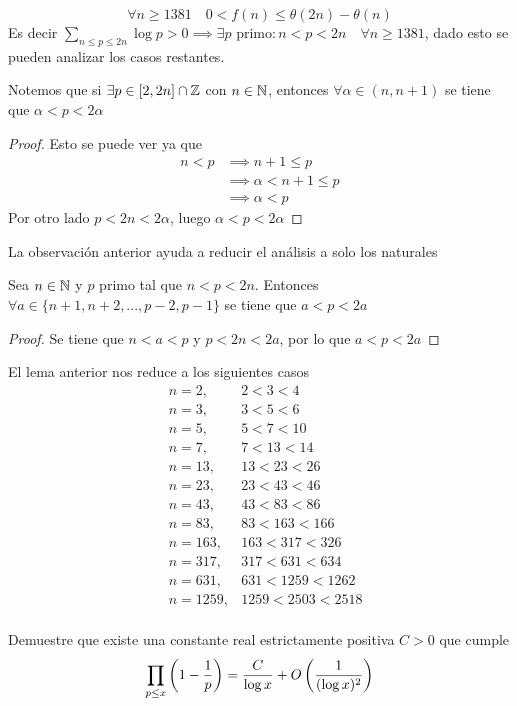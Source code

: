 \begin{sol}
	\[\forall n\geq1381\quad0<f(n)\leq\theta(2n)-\theta(n)\]
	Es decir $\displaystyle\sum_{n\leq p\leq 2n}\log{p}>0\implies\exists p\text{ primo}:n<p<2n\quad\forall n\geq1381$, dado esto se pueden analizar los casos restantes.
	\begin{obs}
		Notemos que si $\exists p\in[2,2n]\cap\mathbb{Z}$ con $n\in\mathbb{N}$, entonces $\forall\alpha\in(n,n+1)$ se tiene que $\alpha<p<2\alpha$
		\begin{proof}
			Esto se puede ver ya que
			\begin{align*}
				n<p & \implies n+1\leq p       \\
				    & \implies\alpha<n+1\leq p \\
				    & \implies\alpha<p
			\end{align*}
			Por otro lado $p<2n<2\alpha$, luego $\alpha<p<2\alpha$
		\end{proof}
	\end{obs}
	{\flushleft La observación anterior ayuda a reducir el análisis a solo los naturales}
	\begin{lem}
		Sea $n\in\mathbb{N}$ y $p$ primo tal que $n<p<2n$. Entonces $\forall a\in\{n+1,n+2,...,p-2,p-1\}$ se tiene que $a<p<2a$
		\begin{proof}
			Se tiene que $n<a<p$ y $p<2n<2a$, por lo que $a<p<2a$
		\end{proof}
	\end{lem}
	{\flushleft El lema anterior nos reduce a los siguientes casos}
	\begin{align*}
		 & n=2,    & 2<3<4          \\
		 & n=3,    & 3<5<6          \\
		 & n=5,    & 5<7<10         \\
		 & n=7,    & 7<13<14        \\
		 & n=13,   & 13<23<26       \\
		 & n=23,   & 23<43<46       \\
		 & n=43,   & 43<83<86       \\
		 & n=83,   & 83<163<166     \\
		 & n=163,  & 163<317<326    \\
		 & n=317,  & 317<631<634    \\
		 & n=631,  & 631<1259<1262  \\
		 & n=1259, & 1259<2503<2518 \\
	\end{align*}

\end{sol}

\begin{prob}[4 pts.]
	Demuestre que existe una constante real estrictamente positiva $C>0$ que cumple
	\[\prod_{p\leq x}\left(1-\frac{1}{p}\right)=\frac{C}{\log x}+O\left(\frac{1}{(\log x)^2}\right)\]
\end{prob}

\begin{sol}

\end{sol}

